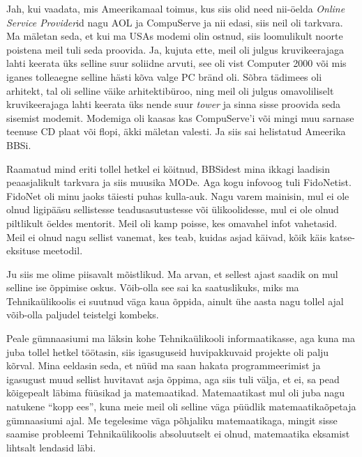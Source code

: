 Jah, kui vaadata, mis Ameerikamaal toimus, kus siis olid need nii-öelda 
\emph{Online Service Provider}id  nagu AOL  ja 
CompuServe ja nii edasi, siis neil oli tarkvara. Ma mäletan seda, et 
kui ma USAs modemi  olin ostnud, siis loomulikult noorte poistena meil tuli 
seda proovida. Ja, kujuta ette, meil oli julgus kruvikeerajaga lahti keerata 
üks selline suur soliidne arvuti, see oli vist Computer 2000 või mis iganes 
tolleaegne  selline hästi kõva valge PC bränd oli. Sõbra tädimees oli 
arhitekt, tal oli selline väike arhitektibüroo, ning meil oli julgus  
omavoliliselt kruvikeerajaga  lahti keerata üks nende suur \emph{tower} ja 
sinna sisse proovida seda sisemist modemit. Modemiga oli kaasas kas 
CompuServe'i või mingi muu sarnase teenuse CD plaat või flopi, äkki mäletan 
valesti. Ja siis sai helistatud Ameerika BBSi.  


Raamatud mind eriti  tollel hetkel ei köitnud, BBSidest mina ikkagi laadisin 
peaasjalikult tarkvara ja siis muusika MODe. Aga kogu infovoog 
tuli FidoNetist. FidoNet oli minu jaoks täiesti puhas kulla-auk. Nagu varem 
mainisin,  mul ei ole olnud ligipääsu sellistesse teadusasutustesse või 
ülikoolidesse,  mul ei ole olnud piltlikult öeldes mentorit. Meil oli kamp 
poisse, kes omavahel  infot vahetasid. Meil ei olnud nagu sellist vanemat, kes 
teab, kuidas asjad käivad,  kõik käis katse-eksituse meetodil.


Ju siis me olime piisavalt mõistlikud. Ma arvan, et sellest ajast saadik on mul 
selline ise õppimise  oskus. Võib-olla see sai ka saatuslikuks, miks ma 
Tehnikaülikoolis ei suutnud väga kaua õppida,  ainult ühe aasta nagu tollel 
ajal võib-olla paljudel teistelgi kombeks.

Peale gümnaasiumi ma läksin kohe Tehnikaülikooli informaatikasse, aga kuna ma juba tollel hetkel töötasin, siis 
igasuguseid huvipakkuvaid projekte oli  palju kõrval. Mina eeldasin seda, et 
nüüd ma saan hakata programmeerimist ja igasugust muud sellist huvitavat asja 
õppima, aga siis tuli välja, et ei,  sa pead kõigepealt läbima füüsikad ja 
matemaatikad. Matemaatikast mul oli juba nagu natukene \enquote{kopp ees}, kuna 
meie meil oli selline väga püüdlik matemaatikaõpetaja gümnaasiumi ajal. Me 
tegelesime väga põhjaliku matemaatikaga, mingit sisse saamise probleemi 
Tehnikaülikoolis  absoluutselt ei olnud,  matemaatika eksamist lihtsalt 
lendasid läbi.

